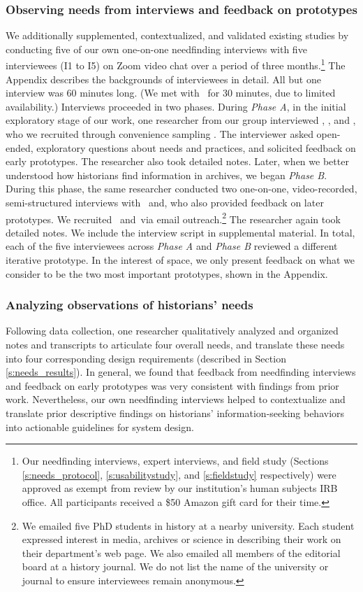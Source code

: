 \subsubsection{Observing needs from interviews and feedback on prototypes} We additionally supplemented, contextualized, and validated existing studies by conducting five of our own one-on-one needfinding interviews with five interviewees (I1 to I5) on Zoom video chat over a period of three months.\footnote{Our needfinding interviews, expert interviews, and field study (Sections \ref{s:needs_protocol}, \ref{s:usabilitystudy}, and \ref{s:fieldstudy} respectively) were approved as exempt from review by our institution's human subjects IRB office.
All participants received a \$50 Amazon gift card for their time.} 
The Appendix describes the backgrounds of interviewees in detail.
All but one interview was 60 minutes long. (We met with \ifour~for 30 minutes, due to limited availability.) Interviews proceeded in two phases. During \textit{Phase A}, in the initial exploratory stage of our work, one researcher from our group interviewed \itwo, \ifour, and \ifive, who we recruited through convenience sampling \cite{given_sage_2008}.
The interviewer asked open-ended, exploratory questions about needs and practices, and solicited feedback on early prototypes. 
The researcher also took detailed notes.
Later, when we better understood how historians find information in archives, we began \textit{Phase B}.
During this phase, the same researcher conducted two one-on-one, video-recorded, semi-structured interviews with \ione~and\ithree, who also provided feedback on later prototypes. 
We recruited \ione~and\ithree~via email outreach.\footnote{
We emailed five PhD students in history at a nearby university. 
Each student expressed interest in media, archives or science in describing their work on their department's web page.
We also emailed all members of the editorial board at a history journal.
We do not list the name of the university or journal to ensure interviewees remain anonymous.
} 
The researcher again took detailed notes.
We include the interview script in supplemental material. 
In total, each of the five interviewees across \textit{Phase A} and \textit{Phase B} reviewed a different iterative prototype.
In the interest of space, we only present feedback on what we consider to be the two most important prototypes, shown in the Appendix.

\subsubsection{Analyzing observations of historians' needs}
Following data collection, one researcher qualitatively analyzed and organized  notes and transcripts to articulate four overall needs, and translate these needs into four corresponding design requirements (described in Section \ref{s:needs_results}).
In general, we found that feedback from needfinding interviews and feedback on early prototypes was very consistent with findings from prior work.
Nevertheless, our own needfinding interviews helped to contextualize and translate prior descriptive findings on historians' information-seeking behaviors into actionable guidelines for system design.



